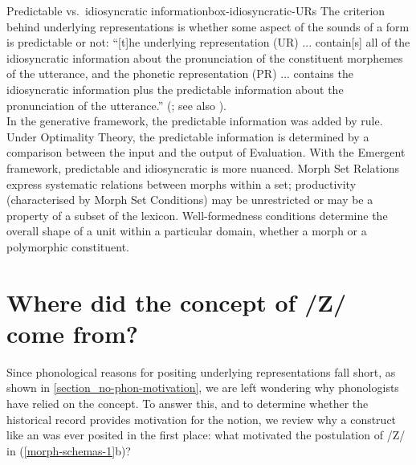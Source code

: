 \begin{dadpbox}{Predictable vs.\ idiosyncratic information}{box-idiosyncratic-URs}
The criterion behind underlying representations is whether some aspect of the sounds of a form is predictable or not: ``[t]he underlying representation (UR) ... contain[s] all of the idiosyncratic information about the pronunciation of the constituent morphemes of the utterance, and the phonetic representation (PR) ...  contains the idiosyncratic information plus the predictable information about the pronunciation of the utterance.'' (\citealt[32]{Kenstowicz+:1979}; see also \citealt{Archangeli:1984, Cole+:2011}).\\

In the generative framework, the predictable information was added by rule. Under Optimality Theory, the predictable information is determined by a comparison between the input and the output of Evaluation. With the Emergent framework, predictable and idiosyncratic is more nuanced. Morph Set Relations express systematic relations between morphs within a set; productivity (characterised by Morph Set Conditions) may be unrestricted or may be a property of a subset of the lexicon. Well-formedness conditions determine the overall shape of a unit within a particular domain, whether a morph or a polymorphic constituent.
\end{dadpbox}

\section{Where did the concept of /Z/ come from?}
\label{URs_history_section} \label{morph-sets-as-building-blocks-section}

Since phonological reasons for positing underlying representations fall short, as shown in \Sec\ref{section_no-phon-motivation}, we are left wondering why phonologists have relied on the concept. To answer this, and to determine whether the historical record provides motivation for the notion,  we review why a construct like an  was ever posited in the first place: what motivated the postulation of /Z/ in (\ref{morph-schemas-1}b)? 


